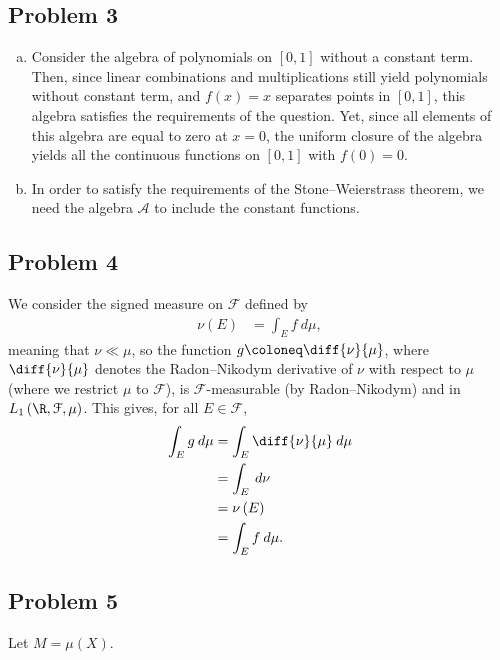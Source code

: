 \documentclass[10pt]{mypackage}
\begin{document}
\subsection{Problem 3}%
\begin{enumerate}[(a)]
  \item Consider the algebra of polynomials on $[0,1]$ without a constant term. Then, since linear combinations and multiplications still yield polynomials without constant term, and $f(x) = x$ separates points in $[0,1]$, this algebra satisfies the requirements of the question. Yet, since all elements of this algebra are equal to zero at $x= 0$, the uniform closure of the algebra yields all the continuous functions on $[0,1]$ with $f(0) = 0$.
  \item In order to satisfy the requirements of the Stone--Weierstrass theorem, we need the algebra $\mathcal{A}$ to include the constant functions.
\end{enumerate}
\subsection{Problem 4}%
We consider the signed measure on $ \mathcal{F} $ defined by
\begin{align*}
  \nu(E) &= \int_{E}^{} f\:d\mu,
\end{align*}
meaning that $\nu\ll \mu$, so the function $g \coloneq \diff{\nu}{\mu}$, where $\diff{\nu}{\mu}$ denotes the Radon--Nikodym derivative of $\nu$ with respect to $\mu$ (where we restrict $\mu$ to $\mathcal{F}$), is $\mathcal{F}$-measurable (by Radon--Nikodym) and in $L_1\left( \R,\mathcal{F},\mu \right)$. This gives, for all $E\in \mathcal{F}$,
\begin{align*}
  \int_{E}^{} g\:d\mu &= \int_{E}^{} \diff{\nu}{\mu}\:d\mu\\
                      &= \int_{E}^{} \:d\nu\\
                      &= \nu\left( E \right)\\
                      &= \int_{E}^{} f\:d\mu.
\end{align*}
\subsection{Problem 5}%
Let $M = \mu(X)$.\newline
\end{document}
